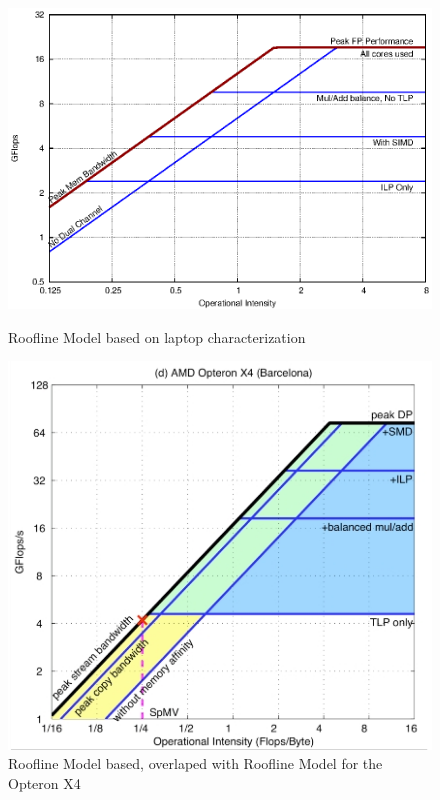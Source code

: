 \begin{figure}[!htp]
	\begin{minipage}[t]{0.5\linewidth}
		\includegraphics[width=\textwidth]{images/roofline.eps}
		\caption[Roofline Model]{Roofline Model based on laptop characterization \label{fig:roofline}}
	\end{minipage}
	\hspace{0.5cm}
	\begin{minipage}[t]{0.5\linewidth}
		\includegraphics[width=\textwidth]{images/roofline_x4.jpg}
		\caption[Roofline Model with Opteron X4]{Roofline Model based, overlaped with Roofline Model for the Opteron X4 \label{fig:rooflinex4}}
	\end{minipage}
\end{figure}

